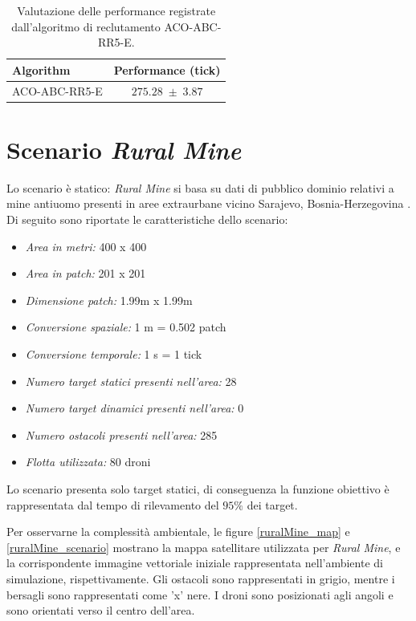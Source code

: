 \begin{table}[H]
    \centering
    \captionsetup{justification=centering, margin=2cm, font=footnotesize}
    \begin{tabular}{|l|c|}
    \hline
    \textbf{Algorithm}              & \textbf{Performance (tick)}              \\ \hline
    ACO-ABC-RR5-E                & $275.28 \; \pm \; 3.87$           \\ \hline
    \end{tabular}%
    
    \caption{Valutazione delle performance registrate dall'algoritmo di reclutamento ACO-ABC-RR5-E.}
    \label{tabella_performance_dump}
\end{table}

\section{Scenario \textit{Rural Mine}}

Lo scenario è statico: \textit{Rural Mine} si basa su dati di pubblico dominio relativi a mine antiuomo presenti in aree extraurbane vicino Sarajevo, Bosnia-Herzegovina \cite{seedemining2018}.
Di seguito sono riportate le caratteristiche dello scenario:

\begin{itemize}
    \item \textit{Area in metri:} 400 x 400
    \item \textit{Area in patch:} 201 x 201
    \item \textit{Dimensione patch:} 1.99m x 1.99m
    \item \textit{Conversione spaziale:} 1 m = 0.502 patch
    \item \textit{Conversione temporale:} 1 s = 1 tick
    \item \textit{Numero target statici presenti nell'area:} 28
    \item \textit{Numero target dinamici presenti nell'area:} 0
    \item \textit{Numero ostacoli presenti nell'area:} 285
    \item \textit{Flotta utilizzata:} 80 droni
\end{itemize}

Lo scenario presenta solo target statici, di conseguenza la funzione obiettivo è rappresentata dal tempo di rilevamento del $95 \%$ dei target.

Per osservarne la complessità ambientale, le figure \ref{ruralMine_map} e \ref{ruralMine_scenario} mostrano la mappa satellitare utilizzata per \textit{Rural Mine}, e la corrispondente immagine vettoriale iniziale rappresentata nell'ambiente di simulazione, rispettivamente. 
Gli ostacoli  sono rappresentati in grigio, mentre i bersagli sono rappresentati come 'x' nere. 
I droni sono posizionati agli angoli e sono orientati verso il centro dell'area.

